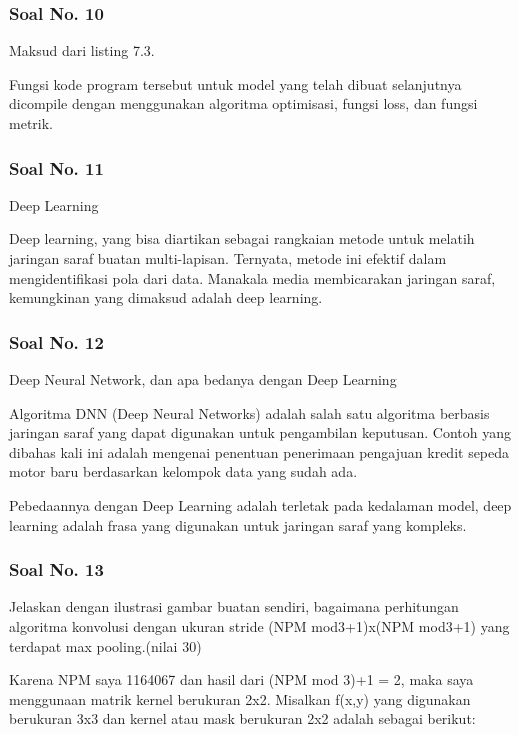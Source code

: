 \subsubsection{Soal No. 10}
Maksud dari listing 7.3.

\hfill \break

Fungsi kode program tersebut untuk model yang telah dibuat selanjutnya dicompile dengan menggunakan algoritma optimisasi, fungsi loss, dan fungsi metrik.

\subsubsection{Soal No. 11}
Deep Learning

\hfill \break

Deep learning, yang bisa diartikan sebagai rangkaian metode untuk melatih jaringan saraf buatan multi-lapisan. Ternyata, metode ini efektif dalam mengidentifikasi pola dari data. Manakala media membicarakan jaringan saraf, kemungkinan yang dimaksud adalah deep learning.

\subsubsection{Soal No. 12}
Deep Neural Network, dan apa bedanya dengan Deep Learning

\hfill \break

Algoritma DNN (Deep Neural Networks) adalah salah satu algoritma berbasis jaringan saraf yang dapat digunakan untuk pengambilan keputusan. Contoh yang dibahas kali ini adalah mengenai penentuan penerimaan pengajuan kredit sepeda motor baru berdasarkan kelompok data yang sudah ada. 

Pebedaannya dengan Deep Learning adalah terletak pada kedalaman model, deep learning adalah frasa yang digunakan untuk jaringan saraf yang kompleks.

\subsubsection{Soal No. 13}
Jelaskan dengan ilustrasi gambar buatan sendiri, bagaimana perhitungan algoritma konvolusi dengan ukuran stride (NPM mod3+1)x(NPM mod3+1) yang terdapat max pooling.(nilai 30)

Karena NPM saya 1164067 dan hasil dari (NPM mod 3)+1 = 2, maka saya menggunaan matrik kernel berukuran 2x2. Misalkan f(x,y) yang digunakan berukuran 3x3 dan kernel atau mask berukuran 2x2 adalah sebagai berikut:

